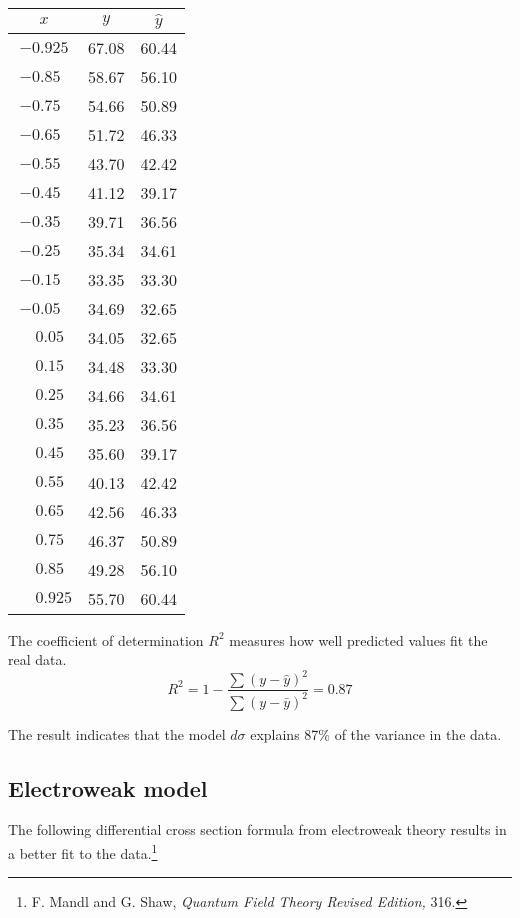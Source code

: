 \documentclass[12pt]{article}
\begin{document}
\begin{center}
\begin{tabular}{|c|c|c|}
\hline
$x$ & $y$ & $\hat{y}$ \\
\hline
$-0.925$ & 67.08 & 60.44\\
$-0.85\phantom{0}$ & 58.67 & 56.10\\
$-0.75\phantom{0}$ & 54.66 & 50.89\\
$-0.65\phantom{0}$ & 51.72 & 46.33\\
$-0.55\phantom{0}$ & 43.70 & 42.42\\
$-0.45\phantom{0}$ & 41.12 & 39.17\\
$-0.35\phantom{0}$ & 39.71 & 36.56\\
$-0.25\phantom{0}$ & 35.34 & 34.61\\
$-0.15\phantom{0}$ & 33.35 & 33.30\\
$-0.05\phantom{0}$ & 34.69 & 32.65\\
$\phantom{+}0.05\phantom{0}$ & 34.05 & 32.65\\
$\phantom{+}0.15\phantom{0}$ & 34.48 & 33.30\\
$\phantom{+}0.25\phantom{0}$ & 34.66 & 34.61\\
$\phantom{+}0.35\phantom{0}$ & 35.23 & 36.56\\
$\phantom{+}0.45\phantom{0}$ & 35.60 & 39.17\\
$\phantom{+}0.55\phantom{0}$ & 40.13 & 42.42\\
$\phantom{+}0.65\phantom{0}$ & 42.56 & 46.33\\
$\phantom{+}0.75\phantom{0}$ & 46.37 & 50.89\\
$\phantom{+}0.85\phantom{0}$ & 49.28 & 56.10\\
$\phantom{+}0.925$ & 55.70 & 60.44\\
\hline
\end{tabular}
\end{center}

The coefficient of determination $R^2$ measures how well predicted values fit the real data.
\begin{equation*}
R^2=1-\frac{\sum(y-\hat{y})^2}{\sum(y-\bar{y})^2}=0.87
\end{equation*}

The result indicates that the model $d\sigma$ explains 87\% of the variance in the data.

\subsection*{Electroweak model}
The following differential cross section formula from electroweak
theory results in a better fit to the
data.\footnote{F. Mandl and G. Shaw, {\it Quantum Field Theory Revised Edition,} 316.}
\end{document}
